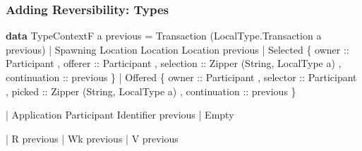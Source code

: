 \documentclass[12pt]{beamer}
\newenvironment{Shaded}{}{}
\newcommand{\KeywordTok}[1]{\textcolor[rgb]{0.00,0.44,0.13}{\textbf{#1}}}
\newcommand{\DataTypeTok}[1]{\textcolor[rgb]{0.56,0.13,0.00}{#1}}
\newcommand{\OtherTok}[1]{\textcolor[rgb]{0.00,0.44,0.13}{#1}}
\newcommand{\FunctionTok}[1]{\textcolor[rgb]{0.02,0.16,0.49}{#1}}
\newcommand{\NormalTok}[1]{#1}
\begin{document}
\begin{frame}[fragile]
\frametitle{Adding Reversibility: Types}

\begin{Shaded}
\begin{Highlighting}[]
\KeywordTok{data} \DataTypeTok{TypeContextF}\NormalTok{ a previous }
    \FunctionTok{=} \DataTypeTok{Transaction}\NormalTok{ (}\DataTypeTok{LocalType.Transaction}\NormalTok{ a previous)}
    \FunctionTok{|} \DataTypeTok{Spawning} \DataTypeTok{Location} \DataTypeTok{Location} \DataTypeTok{Location}\NormalTok{ previous}
    \FunctionTok{|} \DataTypeTok{Selected} 
\NormalTok{        \{}\OtherTok{ owner ::} \DataTypeTok{Participant}
\NormalTok{        ,}\OtherTok{ offerer ::} \DataTypeTok{Participant} 
\NormalTok{        ,}\OtherTok{ selection ::} \DataTypeTok{Zipper}\NormalTok{ (}\DataTypeTok{String}\NormalTok{, }\DataTypeTok{LocalType}\NormalTok{ a)}
\NormalTok{        ,}\OtherTok{ continuation ::}\NormalTok{ previous }
\NormalTok{        \}}
    \FunctionTok{|} \DataTypeTok{Offered} 
\NormalTok{        \{}\OtherTok{ owner ::} \DataTypeTok{Participant}
\NormalTok{        ,}\OtherTok{ selector ::} \DataTypeTok{Participant} 
\NormalTok{        ,}\OtherTok{ picked ::} \DataTypeTok{Zipper}\NormalTok{ (}\DataTypeTok{String}\NormalTok{, }\DataTypeTok{LocalType}\NormalTok{ a)}
\NormalTok{        ,}\OtherTok{ continuation ::}\NormalTok{ previous }
\NormalTok{        \}}

    \FunctionTok{|} \DataTypeTok{Application} \DataTypeTok{Participant} \DataTypeTok{Identifier}\NormalTok{ previous }
    \FunctionTok{|} \DataTypeTok{Empty} 

    \FunctionTok{|} \DataTypeTok{R}\NormalTok{ previous  }
    \FunctionTok{|} \DataTypeTok{Wk}\NormalTok{ previous}
    \FunctionTok{|} \DataTypeTok{V}\NormalTok{ previous}
\end{Highlighting}
\end{Shaded}

\end{frame}
\end{document}
